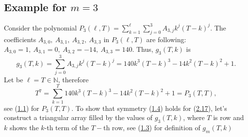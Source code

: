 \documentclass[11pt, letterpaper]{amsart} da da ya qq
\theoremstyle{definition}
\theoremstyle{remark}
\numberwithin{equation}{section}
\begin{document}
\subsection{Example for \texorpdfstring{$m=3$}{m=3}}
Consider the polynomial $P_3(\ell,T)=\sum_{k=1}^{\ell}\sum_{j=0}^3 A_{3,j}k^j(T-k)^j$.
The coefficients $A_{3,0}, \ A_{3,1}, \ A_{3,2}, \ A_{3,3}$ in $P_3(\ell,T)$ are following: $A_{3,0}=1, \ A_{3,1}=0, \ A_{3,2}=-14, \ A_{3,3}=140$. Thus, $g_3(T,k)$ is
\begin{equation}\label{7th_pow_generating_function}
g_3(T,k)=\sum_{j=0}^3 A_{3,j}k^j(T-k)^j=140k^3(T-k)^3-14k^2(T-k)^2+1.
\end{equation}
Let be $\ell=T\in\mathbb{N}$, therefore
\begin{equation}\label{seventh_power_identity}
T^7=\sum_{k=1}^{T} 140k^3(T-k)^3-14k^2(T-k)^2+1=P_3(T,T),
\end{equation}
see (\hyperref[f1]{1.1}) for $P_3(T,T)$. To show that symmetry (\hyperref[symmetry_2]{1.4}) holds for (\hyperref[7th_pow_generating_function]{2.17}), let's construct a triangular array filled by the values of $g_3(T,k)$, where $T$ is row and $k$ shows the $k$-th term of the $T-$th row, see (\hyperref[symmetry_1]{1.3}) for definition of $g_m(T,k)$
\end{document}
